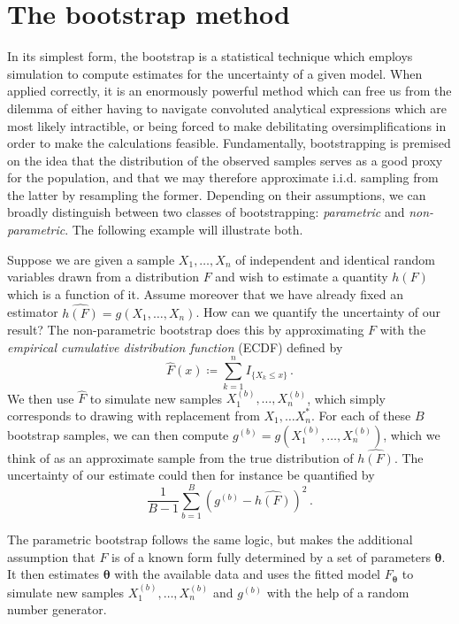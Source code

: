 \documentclass[a4paper]{book}
\theoremstyle{plain}
\begin{document}
\section{The bootstrap method} \label{sec:boot}

In its simplest form, the bootstrap is a statistical technique which employs simulation to compute estimates for the uncertainty of a given model. When applied correctly, it is an enormously powerful method which can free us from the dilemma of either having to navigate convoluted analytical expressions which are most likely intractible, or being forced to make debilitating oversimplifications in order to make the calculations feasible. Fundamentally, bootstrapping is premised on the idea that the distribution of the observed samples serves as a good proxy for the population, and that we may therefore approximate i.i.d. sampling from the latter by resampling the former. Depending on their assumptions, we can broadly distinguish  between two classes of bootstrapping: \emph{parametric} and \emph{non-parametric}. The following example will illustrate both.

Suppose we are given a sample $X_1, \dots, X_n$ of independent and identical random variables drawn from a distribution $F$ and wish to estimate a quantity $h(F)$ which is a function of it. Assume moreover that we have already fixed an estimator $\widehat{h(F)} = g(X_1, \dots, X_n)$. How can we quantify the uncertainty of our result? The non-parametric bootstrap does this by approximating $F$ with the \emph{empirical cumulative distribution function} (ECDF) defined by
\begin{equation}
    \hat{F}(x) \coloneqq \sum_{k=1}^n I_{\{ X_k \leq x \}} \,.
\end{equation}
We then use $\hat{F}$ to simulate new samples $X^{(b)}_1, \dots, X^{(b)}_n$, which simply corresponds to drawing with replacement from $X_1, \dots X^*_n$. For each of these $B$ bootstrap samples, we can then compute $g^{(b)} = g(X^{(b)}_1, \dots, X^{(b)}_n)$, which we think of as an approximate sample from the true distribution of $\widehat{h(F)}$. The uncertainty of our estimate could then for instance be quantified by
\begin{equation}
    \frac{1}{B-1}\sum_{b=1}^B(g^{(b)} - \widehat{h(F)})^2 
    \,.
\end{equation}

The parametric bootstrap follows the same logic, but makes the additional assumption that $F$ is of a known form fully determined by a set of parameters $\bm{\theta}$. It then estimates $\bm{\theta}$ with the available data and uses the fitted model $F_{\bm{\theta}}$ to simulate new samples $X^{(b)}_1, \dots, X^{(b)}_n$ and $g^{(b)}$ with the help of a random number generator.
\end{document}

